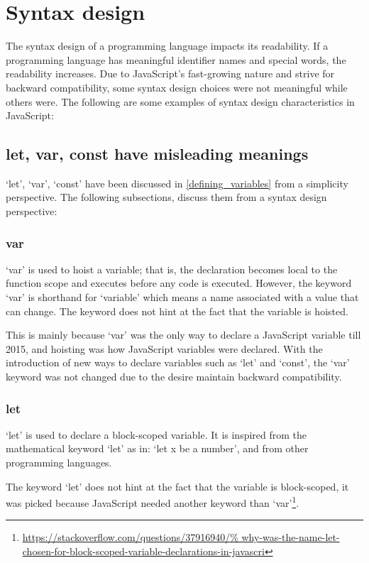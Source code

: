 \documentclass[11pt,a4paper]{article}
\begin{document}
\section{Syntax design}
The syntax design of a programming language impacts its readability.
If a programming language has meaningful identifier names and special words, the readability increases.
Due to JavaScript's fast-growing nature and strive for backward compatibility,
some syntax design choices were not meaningful while others were.
The following are some examples of syntax design characteristics in JavaScript:

\subsection{let, var, const have misleading meanings}
`let', `var', `const' have been discussed in \ref{defining_variables} from a simplicity perspective.
The following subsections, discuss them from a syntax design perspective:

\subsubsection{var}
`var' is used to hoist a variable;
that is, the declaration becomes local to the function scope and executes before any code is executed.
However, the keyword `var' is shorthand for `variable' which means a name associated with a value that can change.
The keyword does not hint at the fact that the variable is hoisted.

This is mainly because `var' was the only way to declare a JavaScript variable till 2015,
and hoisting was how JavaScript variables were declared.
With the introduction of new ways to declare variables such as `let' and `const',
the `var' keyword was not changed due to the desire maintain backward compatibility.

\subsubsection{let}
`let' is used to declare a block-scoped variable.
It is inspired from the mathematical keyword `let' as in: `let x be a number',
and from other programming languages.

The keyword `let' does not hint at the fact that the variable is block-scoped,
it was picked because JavaScript needed another keyword than
`var'\footnote{\raggedright \url{https://stackoverflow.com/questions/37916940/%
        why-was-the-name-let-chosen-for-block-scoped-variable-declarations-in-javascri}}.
\end{document}
